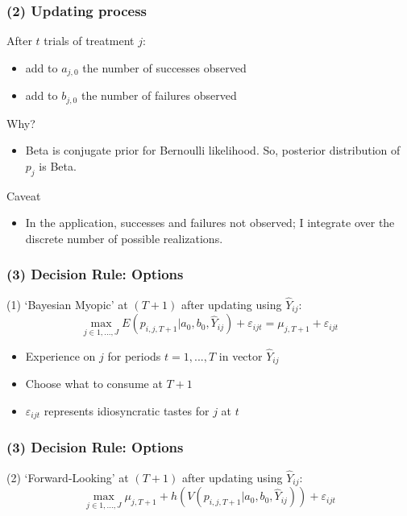 \begin{frame}
\frametitle{(2) Updating process}

After $t$ trials of treatment $j$:

\begin{itemize}
\item add to $a_{j,0}$ the number of successes observed

\item add to $b_{j,0}$ the number of failures observed
\end{itemize}

Why?

\begin{itemize}
\item Beta is conjugate prior for Bernoulli likelihood. So, posterior
distribution of $p_{j}$ is Beta.
\end{itemize}

Caveat

\begin{itemize}
\item In the application, successes and failures not observed; I integrate
over the discrete number of possible realizations.
\end{itemize}
\end{frame}

\begin{frame}
\frametitle{(3) Decision Rule: Options}
\small
(1) `Bayesian Myopic' at $(T+1)$ after updating using $\widehat{Y}_{ij}$: 
\[
\max_{j\in 1,...,J}E(p_{i,j,T+1}|a_{0},b_{0},\widehat{Y}_{ij}) +
\varepsilon_{ijt}=\mu _{j,T+1} + \varepsilon_{ijt} 
\]

\begin{itemize}
\item Experience on $j$ for periods $t=1,...,T$ in vector $\widehat{Y}_{ij}$

\item Choose what to consume at $T+1$

\item $\varepsilon_{ijt}$ represents idiosyncratic tastes for $j$ at $t$
\end{itemize}
\end{frame}


\begin{frame}
\frametitle{(3) Decision Rule: Options}
\small

(2) `Forward-Looking' at $(T+1)$ after updating using $\widehat{Y}_{ij}$:%
\[
\max_{j\in 1,...,J}\mu _{j,T+1} + h(V(p_{i,j,T+1}|a_{0},b_{0},\widehat{Y}%
_{ij})) + \varepsilon_{ijt} 
\]
\end{frame}


